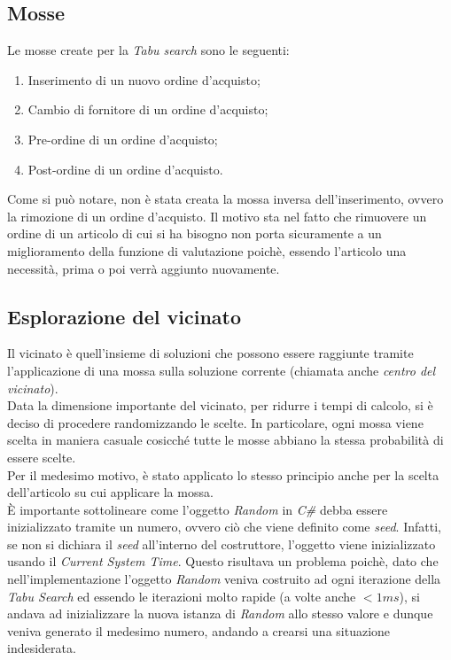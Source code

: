 \subsection{Mosse}
\label{sec:mosse}
\noindent Le mosse create per la \textit{Tabu search} sono le seguenti:
\begin{enumerate}
    \item Inserimento di un nuovo ordine d'acquisto;
    \item Cambio di fornitore di un ordine d'acquisto;
    \item Pre-ordine di un ordine d'acquisto;
    \item Post-ordine di un ordine d'acquisto.
\end{enumerate}
Come si può notare, non è stata creata la mossa inversa dell'inserimento, ovvero la rimozione di un ordine d'acquisto.
Il motivo sta nel fatto che rimuovere un ordine di un articolo di cui si ha bisogno non porta sicuramente a un miglioramento
della funzione di valutazione poichè, essendo l'articolo una necessità, prima o poi verrà aggiunto nuovamente.

\subsection{Esplorazione del vicinato}
\label{sec:esplorazione-vicinato}
\noindent Il vicinato è quell'insieme di soluzioni che possono essere raggiunte
tramite l'applicazione di una mossa sulla soluzione corrente (chiamata anche \textit{centro del vicinato}).\\
Data la dimensione importante del vicinato, per ridurre i tempi di calcolo, si è deciso di procedere randomizzando le scelte.
In particolare, ogni mossa viene scelta in maniera casuale cosicché tutte le mosse
abbiano la stessa probabilità di essere scelte.\\
Per il medesimo motivo, è stato applicato lo stesso principio anche per la scelta dell'articolo su cui applicare
la mossa.\\
È importante sottolineare come l'oggetto \textit{Random} in \textit{C\#}
debba essere inizializzato tramite un numero, ovvero
ciò che viene definito come \textit{seed}. Infatti, se non si dichiara
il \textit{seed} all'interno del costruttore, l'oggetto viene inizializzato usando il
\textit{Current System Time}. Questo risultava un problema poichè, dato che nell'implementazione l'oggetto \textit{Random}
veniva costruito ad ogni iterazione della \textit{Tabu Search} ed essendo le
iterazioni molto rapide (a volte anche $<1ms$), si andava ad inizializzare la nuova istanza
di \textit{Random} allo stesso valore e dunque veniva generato il medesimo
numero, andando a crearsi una situazione indesiderata.


